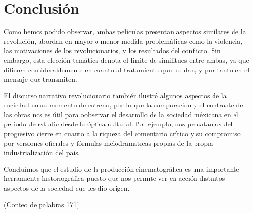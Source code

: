 \section{Conclusión}
Como hemos podido observar, ambas películas presentan aspectos similares de la revolución, abordan en mayor o menor medida problemáticas como la violencia, las motivaciones de los revolucionarios, y los resultados del conflicto. Sin embargo, esta elección temática denota el límite de similitues entre ambas, ya que difieren considerablemente en cuanto al tratamiento que les dan, y por tanto en el mensaje que transmiten.

El discurso narrativo revolucionario también ilustró algunos aspectos de la sociedad en su momento de estreno, por lo que la comparacion y el contraste de las obras nos es útil para oobservar el desarrollo de la sociedad méxicana en el periodo de estudio desde la óptica cultural. Por ejemplo, nos percatamos del progresivo cierre en cuanto a la riqueza del comentario crítico y su compromiso por versiones oficiales y fórmulas melodramáticas propias de la propia industrialización del país. 
 
Concluímos que el estudio de la producción cinematográfica es una importante herramienta historiográfica puesto que nos permite ver en acción distintos aspectos de la sociedad que les dio origen. 

(Conteo de palabras 171)
